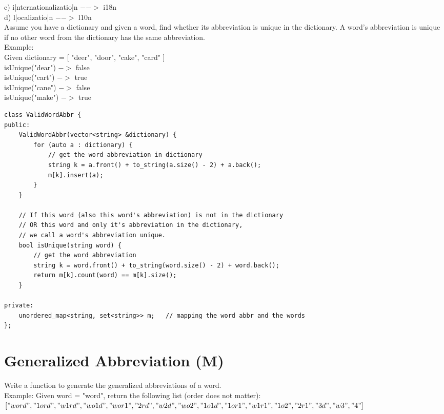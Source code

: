 c) i|nternationalizatio|n  $-->$ i18n\\

d) l|ocalizatio|n          $-->$ l10n\\

Assume you have a dictionary and given a word, find whether its abbreviation is unique in the dictionary. A word's abbreviation is unique if no other word from the dictionary has the same abbreviation.\\

Example: \\
Given dictionary = [ "deer", "door", "cake", "card" ]\\
isUnique("dear") $->$ false\\
isUnique("cart") $->$ true\\
isUnique("cane") $->$ false\\
isUnique("make") $->$ true\\

\begin{lstlisting}
class ValidWordAbbr {
public:
    ValidWordAbbr(vector<string> &dictionary) {
        for (auto a : dictionary) {
            // get the word abbreviation in dictionary
            string k = a.front() + to_string(a.size() - 2) + a.back(); 
            m[k].insert(a);
        }
    }
    
    // If this word (also this word's abbreviation) is not in the dictionary 
    // OR this word and only it's abbreviation in the dictionary,
    // we call a word's abbreviation unique.
    bool isUnique(string word) {
        // get the word abbreviation
        string k = word.front() + to_string(word.size() - 2) + word.back();
        return m[k].count(word) == m[k].size();
    }
    
private:
    unordered_map<string, set<string>> m;   // mapping the word abbr and the words
};
\end{lstlisting}


\section{Generalized Abbreviation (M)}
Write a function to generate the generalized abbreviations of a word.\\

Example: Given word = "word", return the following list (order does not matter):\\
$["word", "1ord", "w1rd", "wo1d", "wor1", "2rd", "w2d", "wo2", "1o1d", "1or1", "w1r1", \\
"1o2", "2r1", "3d", "w3", "4"]$ \\

